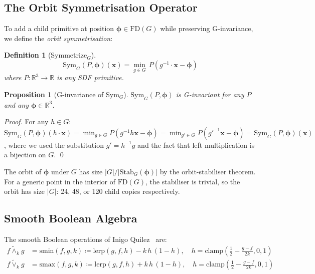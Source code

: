 \documentclass[11pt, a4paper]{article}
\newtheorem{definition}{Definition}[section]
\newtheorem{proposition}{Proposition}[section]
\newcommand{\R}{\mathbb{R}}
\newcommand{\FD}{\mathrm{FD}}
\newcommand{\Stab}{\mathrm{Stab}}
\newcommand{\card}[1]{\lvert #1 \rvert}
\newcommand{\smin}{\mathbin{\tilde{\wedge}}}
\newcommand{\smax}{\mathbin{\tilde{\vee}}}
\begin{document}
\subsection{The Orbit Symmetrisation Operator}
\label{sec:symmetrize}

To add a child primitive at position $\boldsymbol{\phi} \in \FD(G)$ while
preserving G-invariance, we define the \emph{orbit symmetrisation}:

\begin{definition}[Symmetrize$_G$]
\begin{equation}
  \mathrm{Sym}_G(P, \boldsymbol{\phi})(\mathbf{x})
    = \min_{g \in G}\, P(g^{-1} \cdot \mathbf{x} - \boldsymbol{\phi})
  \label{eq:symg}
\end{equation}
where $P: \R^3 \to \R$ is any SDF primitive.
\end{definition}

\begin{proposition}[G-invariance of Sym$_G$]
$\mathrm{Sym}_G(P, \boldsymbol{\phi})$ is G-invariant for any $P$ and any
$\boldsymbol{\phi} \in \R^3$.
\end{proposition}
\begin{proof}
For any $h \in G$:
$\mathrm{Sym}_G(P, \boldsymbol{\phi})(h \cdot \mathbf{x})
= \min_{g \in G} P(g^{-1} h \mathbf{x} - \boldsymbol{\phi})
= \min_{g' \in G} P(g'^{-1} \mathbf{x} - \boldsymbol{\phi})
= \mathrm{Sym}_G(P, \boldsymbol{\phi})(\mathbf{x})$,
where we used the substitution $g' = h^{-1}g$ and the fact that left
multiplication is a bijection on $G$. \qed
\end{proof}

The orbit of $\boldsymbol{\phi}$ under $G$ has size $\card{G}/\card{\Stab_G(\boldsymbol{\phi})}$
by the orbit-stabiliser theorem. For a generic point in the interior of
$\FD(G)$, the stabiliser is trivial, so the orbit has size $\card{G}$:
24, 48, or 120 child copies respectively.

\subsection{Smooth Boolean Algebra}

The smooth Boolean operations of Inigo Quilez~\cite{quilez_smooth} are:
\begin{align}
  f \smin_k g &= \mathrm{smin}(f, g, k)
    \coloneqq \mathrm{lerp}(g, f, h) - k\,h\,(1-h),
    \quad h = \mathrm{clamp}\!\left(\tfrac{1}{2} + \tfrac{g-f}{2k}, 0, 1\right)
    \label{eq:smin}\\
  f \smax_k g &= \mathrm{smax}(f, g, k)
    \coloneqq \mathrm{lerp}(g, f, h) + k\,h\,(1-h),
    \quad h = \mathrm{clamp}\!\left(\tfrac{1}{2} - \tfrac{g-f}{2k}, 0, 1\right)
    \label{eq:smax}
\end{align}
\end{document}
